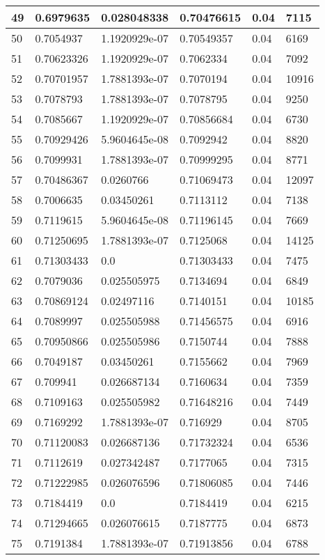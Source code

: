 \begin{longtable}{|l|l|l|l|l|l|}
49 & 0.6979635 & 0.028048338 & 0.70476615 & 0.04 & 7115 \\ \hline 
50 & 0.7054937 & 1.1920929e-07 & 0.70549357 & 0.04 & 6169 \\ \hline 
51 & 0.70623326 & 1.1920929e-07 & 0.7062334 & 0.04 & 7092 \\ \hline 
52 & 0.70701957 & 1.7881393e-07 & 0.7070194 & 0.04 & 10916 \\ \hline 
53 & 0.7078793 & 1.7881393e-07 & 0.7078795 & 0.04 & 9250 \\ \hline 
54 & 0.7085667 & 1.1920929e-07 & 0.70856684 & 0.04 & 6730 \\ \hline 
55 & 0.70929426 & 5.9604645e-08 & 0.7092942 & 0.04 & 8820 \\ \hline 
56 & 0.7099931 & 1.7881393e-07 & 0.70999295 & 0.04 & 8771 \\ \hline 
57 & 0.70486367 & 0.0260766 & 0.71069473 & 0.04 & 12097 \\ \hline 
58 & 0.7006635 & 0.03450261 & 0.7113112 & 0.04 & 7138 \\ \hline 
59 & 0.7119615 & 5.9604645e-08 & 0.71196145 & 0.04 & 7669 \\ \hline 
60 & 0.71250695 & 1.7881393e-07 & 0.7125068 & 0.04 & 14125 \\ \hline 
61 & 0.71303433 & 0.0 & 0.71303433 & 0.04 & 7475 \\ \hline 
62 & 0.7079036 & 0.025505975 & 0.7134694 & 0.04 & 6849 \\ \hline 
63 & 0.70869124 & 0.02497116 & 0.7140151 & 0.04 & 10185 \\ \hline 
64 & 0.7089997 & 0.025505988 & 0.71456575 & 0.04 & 6916 \\ \hline 
65 & 0.70950866 & 0.025505986 & 0.7150744 & 0.04 & 7888 \\ \hline 
66 & 0.7049187 & 0.03450261 & 0.7155662 & 0.04 & 7969 \\ \hline 
67 & 0.709941 & 0.026687134 & 0.7160634 & 0.04 & 7359 \\ \hline 
68 & 0.7109163 & 0.025505982 & 0.71648216 & 0.04 & 7449 \\ \hline 
69 & 0.7169292 & 1.7881393e-07 & 0.716929 & 0.04 & 8705 \\ \hline 
70 & 0.71120083 & 0.026687136 & 0.71732324 & 0.04 & 6536 \\ \hline 
71 & 0.7112619 & 0.027342487 & 0.7177065 & 0.04 & 7315 \\ \hline 
72 & 0.71222985 & 0.026076596 & 0.71806085 & 0.04 & 7446 \\ \hline 
73 & 0.7184419 & 0.0 & 0.7184419 & 0.04 & 6215 \\ \hline 
74 & 0.71294665 & 0.026076615 & 0.7187775 & 0.04 & 6873 \\ \hline 
75 & 0.7191384 & 1.7881393e-07 & 0.71913856 & 0.04 & 6788 \\ \hline 
\end{longtable}